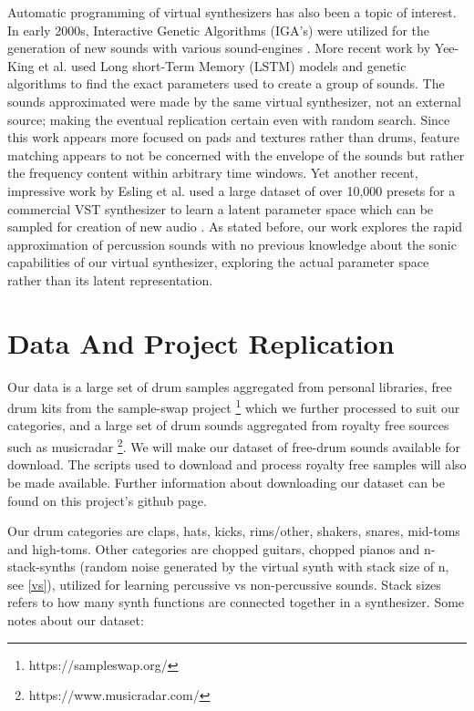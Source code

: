 \documentclass[\main/thesis.tex]{subfiles}
\begin{document}
Automatic programming of virtual synthesizers has also been a topic of interest. In early 2000s, Interactive Genetic Algorithms (IGA's) were utilized for the generation of new sounds with various sound-engines \cite{johnson1999exploring,dahlstedt2001creating}. More recent work by Yee-King et al. \cite{yee2018automatic} used Long short-Term Memory (LSTM) models and genetic algorithms to find the exact parameters used to create a group of sounds. The sounds approximated were made by the same virtual synthesizer, not an external source; making the eventual replication certain even with random search. Since this work appears more focused on pads and textures rather than drums, feature matching appears to not be concerned with the envelope of the sounds but rather the frequency content within arbitrary time windows. Yet another recent, impressive work by Esling et al. used a large dataset of over 10,000 presets for a commercial VST synthesizer to learn a latent parameter space which can be sampled for creation of new audio \cite{esling2019universal}. As stated before, our work explores the rapid approximation of percussion sounds with no previous knowledge about the sonic capabilities of our virtual synthesizer, exploring the actual parameter space rather than its latent representation. 


\section{Data And Project Replication}
\label{data}
Our data is a large set of drum samples aggregated from personal libraries, free drum kits from the sample-swap project \footnote{https://sampleswap.org/} which we further processed to suit our categories, and a large set of drum sounds aggregated from royalty free sources such as musicradar \footnote{https://www.musicradar.com/}. We will make our dataset of free-drum sounds available for download. The scripts used to download and process royalty free samples will also be made available. Further information about downloading our dataset can be found on this project's github page. 

Our drum categories are claps, hats, kicks, rims/other, shakers, snares, mid-toms and high-toms. Other categories are chopped guitars, chopped pianos and n-stack-synths (random noise generated by the virtual synth with stack size of n, see \ref{vs}), utilized for learning percussive vs non-percussive sounds. Stack sizes refers to how many synth functions are connected together in a synthesizer.
Some notes about our dataset:
\end{document}
